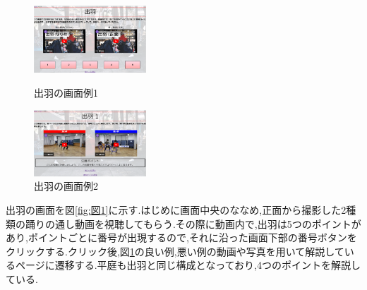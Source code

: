 \documentclass[twocolumn,10pt,a4j]{ltjsarticle}
\begin{document}
\begin{figure}[htbp]
 \begin{minipage}{0.5\hsize}
  \centering
  \includegraphics[width=42mm]{figures/zu11.png}
  \caption{出羽の画面例1}
   \label{fig:図1}
 \end{minipage}
 \begin{minipage}{0.5\hsize}
  \centering
  \includegraphics[width=42mm]{figures/zu12.png}
  \caption{出羽の画面例2}
   \label{fig:図2}
 \end{minipage}
\end{figure}


出羽の画面を図\ref{fig:図1}に示す.はじめに画面中央のななめ,正面から撮影した2種類の踊りの通し動画を視聴してもらう.その際に動画内で,出羽は5つのポイントがあり,ポイントごとに番号が出現するので,それに沿った画面下部の番号ボタンをクリックする.クリック後,図\ref{fig:図2}の良い例,悪い例の動画や写真を用いて解説しているページに遷移する.平庭も出羽と同じ構成となっており,4つのポイントを解説している.
\end{document}
